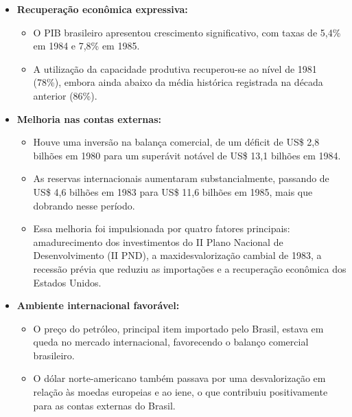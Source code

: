 \documentclass[a4paper,12pt]{article}[abntex2]
\begin{document}
\begin{itemize}

    \item \textbf{Recuperação econômica expressiva:}
    \begin{itemize}
        \item O PIB brasileiro apresentou crescimento significativo, com taxas de 5,4\% em 1984 e 7,8\% em 1985.
        \item A utilização da capacidade produtiva recuperou-se ao nível de 1981 (78\%), embora ainda abaixo da média histórica registrada na década anterior (86\%).
    \end{itemize}

    \item \textbf{Melhoria nas contas externas:}
    \begin{itemize}
        \item Houve uma inversão na balança comercial, de um déficit de US\$ 2,8 bilhões em 1980 para um superávit notável de US\$ 13,1 bilhões em 1984.
        \item As reservas internacionais aumentaram substancialmente, passando de US\$ 4,6 bilhões em 1983 para US\$ 11,6 bilhões em 1985, mais que dobrando nesse período.
        \item Essa melhoria foi impulsionada por quatro fatores principais: amadurecimento dos investimentos do II Plano Nacional de Desenvolvimento (II PND), a maxidesvalorização cambial de 1983, a recessão prévia que reduziu as importações e a recuperação econômica dos Estados Unidos.
    \end{itemize}

    \item \textbf{Ambiente internacional favorável:}
    \begin{itemize}
        \item O preço do petróleo, principal item importado pelo Brasil, estava em queda no mercado internacional, favorecendo o balanço comercial brasileiro.
        \item O dólar norte-americano também passava por uma desvalorização em relação às moedas europeias e ao iene, o que contribuiu positivamente para as contas externas do Brasil.
    \end{itemize}


\end{itemize}
\end{document}
